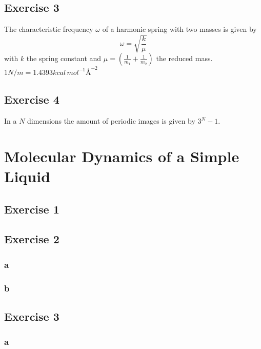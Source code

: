 \documentclass[titlepage]{report}
\begin{document}
\section{Exercise 3}
The characteristic frequency $ \omega $ of a harmonic spring with two masses is given by \cite{Taylor ofzo}
\begin{equation}
	\omega = \sqrt{\frac{k}{\mu}} 
\end{equation}
with $ k $ the spring constant and $ \mu = \left(\frac{1}{m_1} + \frac{1}{m_2}\right) $ the reduced mass. $ 1\unit{N/m} = 1.4393 \unit{kcal \, mol^{-1} \textrm{\AA}^{-2}} $



\section{Exercise 4}
In a $ N $ dimensions the amount of periodic images is given by $ 3^N - 1 $. 


\chapter{Molecular Dynamics of a Simple Liquid}

\section{Exercise 1}

\section{Exercise 2}
\subsection{a}

\subsection{b}

\section{Exercise 3}
\subsection{a}
\end{document}
